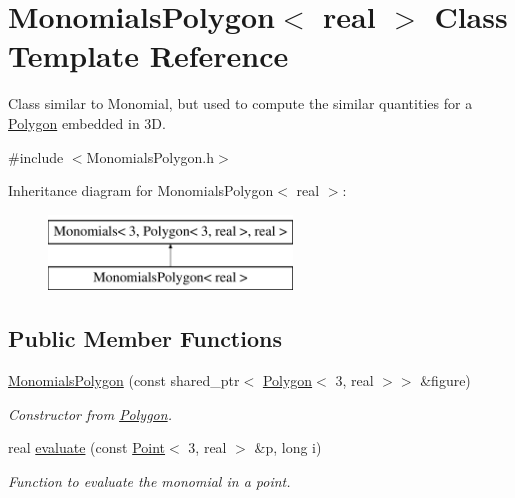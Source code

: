 \hypertarget{class_monomials_polygon}{}\section{Monomials\+Polygon$<$ real $>$ Class Template Reference}
\label{class_monomials_polygon}


Class similar to Monomial, but used to compute the similar quantities for a \hyperlink{class_polygon}{Polygon} embedded in 3D.  




{\ttfamily \#include $<$Monomials\+Polygon.\+h$>$}

Inheritance diagram for Monomials\+Polygon$<$ real $>$\+:\begin{figure}[H]
\begin{center}
\leavevmode
\includegraphics[height=2.000000cm]{class_monomials_polygon}
\end{center}
\end{figure}
\subsection*{Public Member Functions}
\begin{DoxyCompactItemize}
\item 
\hyperlink{class_monomials_polygon_a15ff4c26d8e8948a3233a2cf31cfaccd}{Monomials\+Polygon} (const shared\+\_\+ptr$<$ \hyperlink{class_polygon}{Polygon}$<$ 3, real $>$$>$ \&figure)\hypertarget{class_monomials_polygon_a15ff4c26d8e8948a3233a2cf31cfaccd}{}\label{class_monomials_polygon_a15ff4c26d8e8948a3233a2cf31cfaccd}

\begin{DoxyCompactList}\small\item\em Constructor from \hyperlink{class_polygon}{Polygon}. \end{DoxyCompactList}\item 
real \hyperlink{class_monomials_polygon_a789109ea081ae68f3d2219fc115e7de7}{evaluate} (const \hyperlink{class_point}{Point}$<$ 3, real $>$ \&p, long i)
\begin{DoxyCompactList}\small\item\em Function to evaluate the monomial in a point. \end{DoxyCompactList}\end{DoxyCompactItemize}
